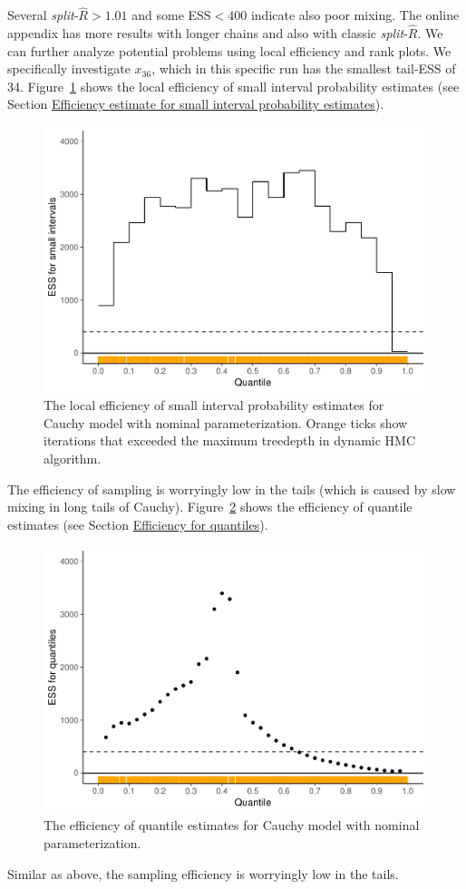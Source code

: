 \documentclass[american,]{article}
\begin{document}
Several \emph{split}-\(\widehat{R}>1.01\) and some ESS\(<400\)
indicate also poor mixing. The online appendix has more results with
longer chains and also with classic \emph{split}-\(\widehat{R}\).
%
We can further analyze potential problems using local efficiency and
rank plots. We specifically investigate \(x_{36}\), which in this
specific run has the smallest tail-ESS of 34. Figure~\ref{fig:local-ess-fit-nom-1} shows
the local efficiency of small interval probability estimates (see
Section \protect\hyperlink{small_interval_S_eff}{Efficiency estimate for
  small interval probability estimates}).
\begin{figure}[tp]
  \centering
  \includegraphics[width=0.6\linewidth]{graphics/local-ess-fit-nom-1.pdf}
  \caption{The local efficiency of small interval probability
    estimates for Cauchy model with nominal parameterization. Orange
    ticks show iterations that exceeded the maximum treedepth in
    dynamic HMC algorithm.}
\label{fig:local-ess-fit-nom-1}
\end{figure}
The efficiency of sampling is worryingly low in the tails (which is
caused by slow mixing in long tails of Cauchy).  
%
Figure~\ref{fig:quantile-ess-fit-nom-1} shows the efficiency
of quantile estimates (see Section
\protect\hyperlink{quantile_S_eff}{Efficiency for quantiles}).
\begin{figure}[tp]
  \centering
  \includegraphics[width=0.6\linewidth]{graphics/quantile-ess-fit-nom-1.pdf}
  \caption{The efficiency of quantile estimates for Cauchy model with nominal parameterization.}
  \label{fig:quantile-ess-fit-nom-1}
\end{figure}
Similar as above, the sampling efficiency is worryingly low in the
tails. 
\end{document}
